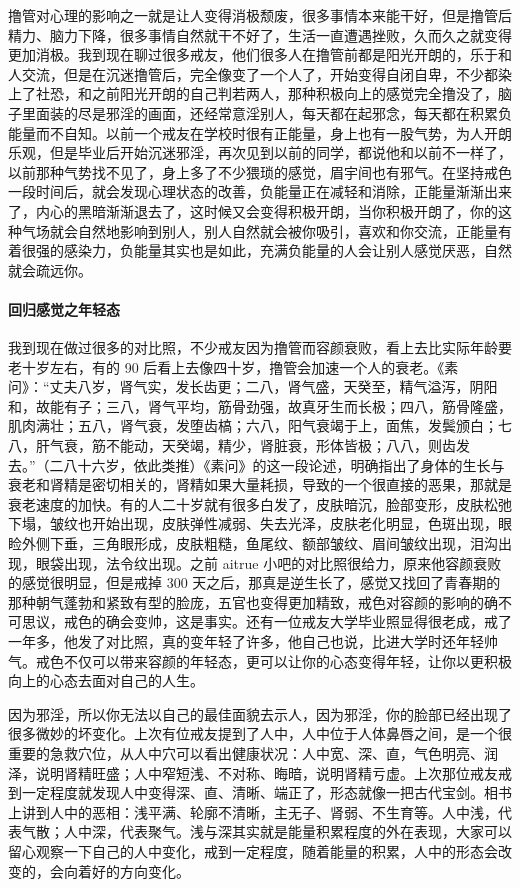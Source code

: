 撸管对心理的影响之一就是让人变得消极颓废，很多事情本来能干好，但是撸管后精力、脑力下降，很多事情自然就干不好了，生活一直遭遇挫败，久而久之就变得更加消极。我到现在聊过很多戒友，他们很多人在撸管前都是阳光开朗的，乐于和人交流，但是在沉迷撸管后，完全像变了一个人了，开始变得自闭自卑，不少都染上了社恐，和之前阳光开朗的自己判若两人，那种积极向上的感觉完全撸没了，脑子里面装的尽是邪淫的画面，还经常意淫别人，每天都在起邪念，每天都在积累负能量而不自知。以前一个戒友在学校时很有正能量，身上也有一股气势，为人开朗乐观，但是毕业后开始沉迷邪淫，再次见到以前的同学，都说他和以前不一样了，以前那种气势找不见了，身上多了不少猥琐的感觉，眉宇间也有邪气。在坚持戒色一段时间后，就会发现心理状态的改善，负能量正在减轻和消除，正能量渐渐出来了，内心的黑暗渐渐退去了，这时候又会变得积极开朗，当你积极开朗了，你的这种气场就会自然地影响到别人，别人自然就会被你吸引，喜欢和你交流，正能量有着很强的感染力，负能量其实也是如此，充满负能量的人会让别人感觉厌恶，自然就会疏远你。

\paragraph{回归感觉之年轻态}

我到现在做过很多的对比照，不少戒友因为撸管而容颜衰败，看上去比实际年龄要老十岁左右，有的 90 后看上去像四十岁，撸管会加速一个人的衰老。《素问》：“丈夫八岁，肾气实，发长齿更；二八，肾气盛，天癸至，精气溢泻，阴阳和，故能有子；三八，肾气平均，筋骨劲强，故真牙生而长极；四八，筋骨隆盛，肌肉满壮；五八，肾气衰，发堕齿槁；六八，阳气衰竭于上，面焦，发鬓颁白；七八，肝气衰，筋不能动，天癸竭，精少，肾脏衰，形体皆极；八八，则齿发去。”（二八十六岁，依此类推）《素问》的这一段论述，明确指出了身体的生长与衰老和肾精是密切相关的，肾精如果大量耗损，导致的一个很直接的恶果，那就是衰老速度的加快。有的人二十岁就有很多白发了，皮肤暗沉，脸部变形，皮肤松弛下塌，皱纹也开始出现，皮肤弹性减弱、失去光泽，皮肤老化明显，色斑出现，眼睑外侧下垂，三角眼形成，皮肤粗糙，鱼尾纹、额部皱纹、眉间皱纹出现，泪沟出现，眼袋出现，法令纹出现。之前 aitrue 小吧的对比照很给力，原来他容颜衰败的感觉很明显，但是戒掉 300 天之后，那真是逆生长了，感觉又找回了青春期的那种朝气蓬勃和紧致有型的脸庞，五官也变得更加精致，戒色对容颜的影响的确不可思议，戒色的确会变帅，这是事实。还有一位戒友大学毕业照显得很老成，戒了一年多，他发了对比照，真的变年轻了许多，他自己也说，比进大学时还年轻帅气。戒色不仅可以带来容颜的年轻态，更可以让你的心态变得年轻，让你以更积极向上的心态去面对自己的人生。

因为邪淫，所以你无法以自己的最佳面貌去示人，因为邪淫，你的脸部已经出现了很多微妙的坏变化。上次有位戒友提到了人中，人中位于人体鼻唇之间，是一个很重要的急救穴位，从人中穴可以看出健康状况：人中宽、深、直，气色明亮、润泽，说明肾精旺盛；人中窄短浅、不对称、晦暗，说明肾精亏虚。上次那位戒友戒到一定程度就发现人中变得深、直、清晰、端正了，形态就像一把古代宝剑。相书上讲到人中的恶相：浅平满、轮廓不清晰，主无子、肾弱、不生育等。人中浅，代表气散；人中深，代表聚气。浅与深其实就是能量积累程度的外在表现，大家可以留心观察一下自己的人中变化，戒到一定程度，随着能量的积累，人中的形态会改变的，会向着好的方向变化。

